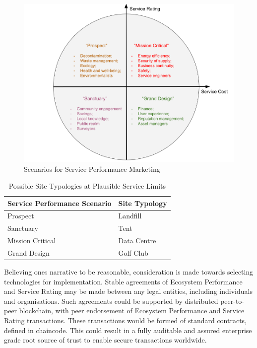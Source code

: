 \documentclass[12pt, oneside]{article}   	%
\begin{document}
\begin{figure}[H]
\centering
\includegraphics[width=1\textwidth]{scenarios}
\caption{Scenarios for Service Performance Marketing}
\label{Scenarios}
\end{figure}

\begin{table}[H]
\caption{Possible Site Typologies at Plausible Service Limits}
\begin{center}
\begin{tabular}{| l | l |}
\hline
Service Performance Scenario&Site Typology\\
\hline
Prospect&Landfill\\
Sanctuary&Tent\\
Mission Critical&Data Centre\\
Grand Design&Golf Club\\
\hline
\end{tabular}
\end{center}
\label{Service limits table}
\end{table}

Believing ones narrative to be reasonable, consideration is made towards selecting technologies for implementation.
Stable agreements of Ecosystem Performance and Service Rating may be made between any legal entities, including individuals and organisations.
Such agreements could be supported by distributed peer-to-peer blockchain, with peer endorsement of Ecosystem Performance and Service Rating transactions.
These transactions would be formed of standard contracts, defined in chaincode.
This could result in a fully auditable and assured enterprise grade root source of trust to enable secure transactions worldwide.\\
\end{document}
